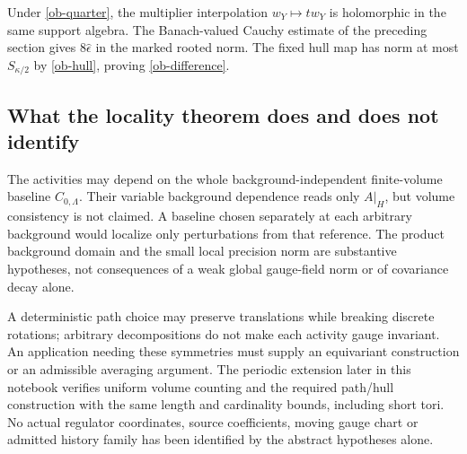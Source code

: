 Under \eqref{ob-quarter}, the multiplier interpolation
$w_Y\mapsto tw_Y$ is holomorphic in the same support algebra.
The Banach-valued Cauchy estimate of the preceding section
gives $8\widehat\epsilon$ in the marked rooted norm.
The fixed hull map has norm at most $S_{\kappa/2}$ by
\eqref{ob-hull}, proving \eqref{ob-difference}.

\subsection{What the locality theorem does and does not identify}

The activities may depend on the whole background-independent
finite-volume baseline $C_{0,\Lambda}$. Their variable background
dependence reads only $A|_H$, but volume consistency is not
claimed. A baseline chosen separately at each arbitrary
background would localize only perturbations from that reference.
The product background domain and the small local precision
norm are substantive hypotheses, not consequences of a weak
global gauge-field norm or of covariance decay alone.

A deterministic path choice may preserve translations while
breaking discrete rotations; arbitrary decompositions do not
make each activity gauge invariant. An application needing
these symmetries must supply an equivariant construction or
an admissible averaging argument.
The periodic extension later in this notebook verifies uniform
volume counting and the required path/hull construction with the
same length and cardinality bounds, including short tori.
No actual regulator coordinates, source coefficients, moving
gauge chart or admitted history family has been identified by
the abstract hypotheses alone.
